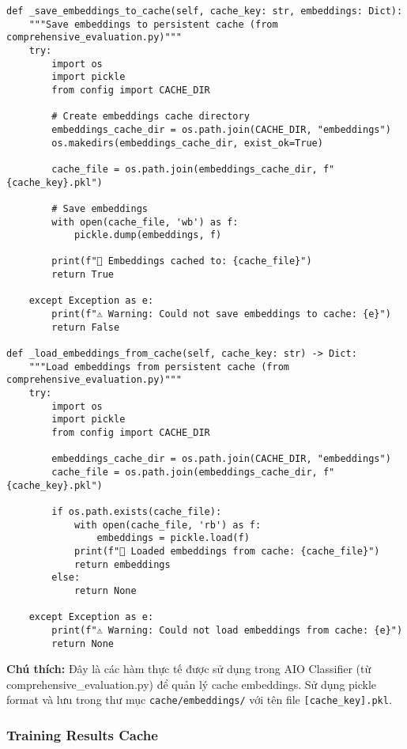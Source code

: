 \begin{verbatim}
def _save_embeddings_to_cache(self, cache_key: str, embeddings: Dict):
    """Save embeddings to persistent cache (from comprehensive_evaluation.py)"""
    try:
        import os
        import pickle
        from config import CACHE_DIR
        
        # Create embeddings cache directory
        embeddings_cache_dir = os.path.join(CACHE_DIR, "embeddings")
        os.makedirs(embeddings_cache_dir, exist_ok=True)
        
        cache_file = os.path.join(embeddings_cache_dir, f"{cache_key}.pkl")
        
        # Save embeddings
        with open(cache_file, 'wb') as f:
            pickle.dump(embeddings, f)
        
        print(f"💾 Embeddings cached to: {cache_file}")
        return True
        
    except Exception as e:
        print(f"⚠️ Warning: Could not save embeddings to cache: {e}")
        return False

def _load_embeddings_from_cache(self, cache_key: str) -> Dict:
    """Load embeddings from persistent cache (from comprehensive_evaluation.py)"""
    try:
        import os
        import pickle
        from config import CACHE_DIR
        
        embeddings_cache_dir = os.path.join(CACHE_DIR, "embeddings")
        cache_file = os.path.join(embeddings_cache_dir, f"{cache_key}.pkl")
        
        if os.path.exists(cache_file):
            with open(cache_file, 'rb') as f:
                embeddings = pickle.load(f)
            print(f"📂 Loaded embeddings from cache: {cache_file}")
            return embeddings
        else:
            return None
            
    except Exception as e:
        print(f"⚠️ Warning: Could not load embeddings from cache: {e}")
        return None
\end{verbatim}

\textbf{Chú thích:} Đây là các hàm thực tế được sử dụng trong AIO Classifier (từ comprehensive\_evaluation.py) để quản lý cache embeddings. Sử dụng pickle format và lưu trong thư mục \texttt{cache/embeddings/} với tên file \texttt{[cache\_key].pkl}.

\subsubsection{Training Results Cache}

